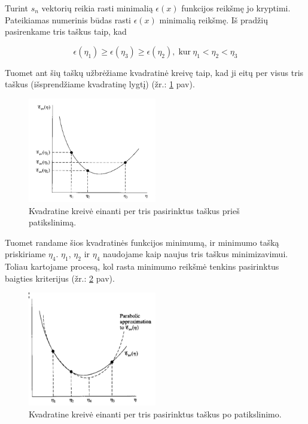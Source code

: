 \documentclass{VUMIFPSmagistrinis}
\begin{document}
Turint $s_{n}$ vektorių reikia rasti minimalią $\epsilon(x)$ funkcijos reikšmę jo kryptimi.
Pateikiamas numerinis būdas rasti $\epsilon(x)$ minimalią reikšmę.
Iš pradžių pasirenkame tris taškus taip, kad

\begin{equation}
	\epsilon(\eta_{1}) \geq \epsilon(\eta_{3}) \geq \epsilon(\eta_{2}), \; \text{kur} \: \eta_{1} < \eta_{2} < \eta_{3}
\end{equation}

Tuomet ant šių taškų užbrėžiame kvadratinė kreivę taip, kad ji eitų per visus tris taškus (išsprendžiame kvadratinę lygtį) (žr.: \ref{kvadratineNepatikslinta} pav).

\begin{figure}[H]
\begin{center}
\includegraphics[width=0.5\textwidth]{kvadratineNepatikslinta.png}
\caption{Kvadratine kreivė einanti per tris pasirinktus taškus prieš patikslinimą.}
\label{kvadratineNepatikslinta}
\end{center}
\end{figure}

Tuomet randame šios kvadratinės funkcijos minimumą, ir minimumo tašką priskiriame $\eta_{4}$.
$\eta_{1}$, $\eta_{2}$ ir $\eta_{4}$ naudojame kaip naujus tris taškus minimizavimui.
Toliau kartojame procesą, kol rasta minimumo reikšmė tenkins pasirinktus baigties kriterijus (žr.: \ref{kvadratinePatikslinta} pav).

\begin{figure}[H]
\begin{center}
\includegraphics[width=0.5\textwidth]{kvadratinePatikslinta.png}
\caption{Kvadratine kreivė einanti per tris pasirinktus taškus po patikslinimo.}
\label{kvadratinePatikslinta}
\end{center}
\end{figure}
\end{document}
